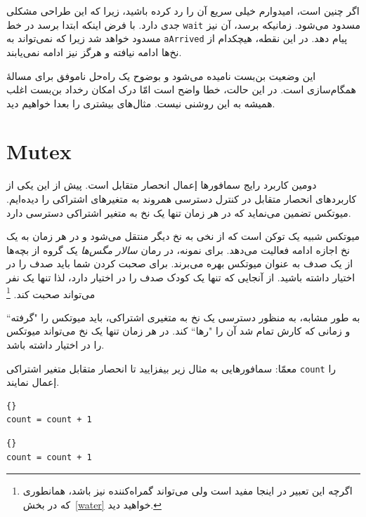 \documentclass{book}
\begin{document}
    اگر چنین است، امیدوارم خیلی سریع آن را رد کرده باشید، زیرا که این طراحی مشکلی جدی دارد. با فرض اینکه ابتدا  برسد 
    در خط \texttt{wait} مسدود می‌شود. زمانیکه   برسد، آن نیز مسدود خواهد شد زیرا که  نمی‌تواند به \texttt{aArrived}
    پیام دهد. در این نقطه، هیچکدام از نخ‌ها ادامه نیافته و هرگز نیز ادامه نمی‌یابند. 

    این وضعیت بن‌بست نامیده می‌شود و بوضوح یک راه‌حل ناموفق برای مسالهٔ همگام‌سازی است. 
    در این حالت، خطا واضح است امّا درک امکان رخداد بن‌بست اغلب همیشه به این روشنی نیست. 
    مثال‌های بیشتری را بعدا خواهیم دید. 
\section{Mutex}

    دومین کاربرد رایج سمافورها إعمال انحصار متقابل است.
    پیش از این یکی از کاربردهای انحصار متقابل در کنترل دسترسی همروند به متغیرهای اشتراکی را دیده‌ایم.    میوتکس
    تضمین می‌نماید که در هر زمان تنها یک نخ به متغیر اشتراکی دسترسی دارد. 

    میوتکس شبیه یک توکن است که از نخی به نخ دیگر منتقل می‌شود و در هر زمان به یک نخ اجازه ادامه فعالیت می‌دهد. 
    برای نمونه، در رمان \emph{سالار مگس‌ها} یک گروه از بچه‌ها از یک صدف به عنوان  میوتکس
    بهره می‌برند. برای صحبت کردن شما باید صدف را در اختیار داشته باشید. از آنجایی که تنها یک کودک صدف را در اختیار دارد، لذا تنها یک نفر می‌تواند 
    صحبت کند. \footnote{اگرچه  این تعبیر در اینجا مفید است ولی می‌تواند گمراه‌‌کننده نیز  باشد، همانطوری که در بخش~\ref{water} خواهید دید. }

    به طور مشابه، به منظور دسترسی یک نخ به متغیری اشتراکی، باید  میوتکس را "گرفته`` و زمانی که کارش تمام شد آن را "رها`` کند. 
    در هر زمان تنها یک نخ می‌تواند  میوتکس را در اختیار داشته باشد. 
    
    معمّا: سمافورهایی به مثال زیر بیفزایید تا انحصار متقابل متغیر اشتراکی \texttt{count} را إعمال نمایند. 
    
\begin{latin}
\begin{minipage}[t]{2in}
\begin{latin}
\begin{lstlisting}[title=\rl{نخ \lr{A}}]{}
count = count + 1
\end{lstlisting}
\end{latin}
\end{minipage}
\hfill
\begin{minipage}[t]{2in}
\begin{latin}
\begin{lstlisting}[title=\rl{نخ \lr{B}}]{}
count = count + 1
\end{lstlisting}
\end{latin}
\end{minipage}
\end{latin}
\end{document}
